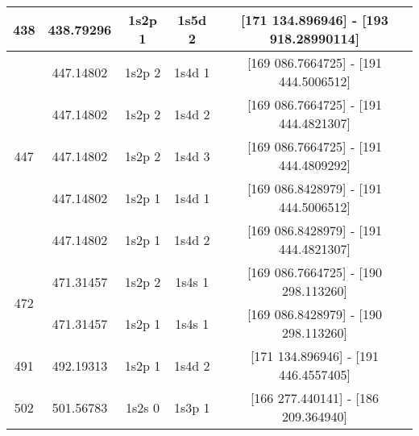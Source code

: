{\begin{table}[B]
\begin{adjustwidth}{-1in}{-1in}
\begin{tabular}{ccccc}
\midrule
	 438& 438.79296 & 1s2p  1&  1s5d  2& [171 134.896946]  	- 	[193 918.28990114]\\
\midrule
	 \multirow{5}{*}{447}& 447.14802& 1s2p  2& 1s4d  1& [169 086.7664725] 	- 	[191 444.5006512]\\
	 & 447.14802 & 1s2p  2& 1s4d  2& [169 086.7664725] 	- 	[191 444.4821307]\\
	 & 447.14802 & 1s2p  2& 1s4d  3& [169 086.7664725] 	- 	[191 444.4809292]\\
	 & 447.14802 & 1s2p  1& 1s4d  1& [169 086.8428979] 	- 	[191 444.5006512] \\
	 & 447.14802 & 1s2p  1& 1s4d  2& [169 086.8428979] 	- 	[191 444.4821307]\\
\midrule
	 \multirow{2}{*}{472}& 471.31457& 1s2p  2& 1s4s 1& [169 086.7664725] 	- 	[190 298.113260] \\
	 & 471.31457&  1s2p  1&  1s4s  1& [169 086.8428979] 	- 	[190 298.113260] \\
\midrule
	 491 & 492.19313 & 1s2p  1&  1s4d  2& [171 134.896946]  	- 	[191 446.4557405]\\
	502 & 501.56783& 1s2s  0& 1s3p  1& [166 277.440141]  	- 	[186 209.364940] \\
\bottomrule
\end{tabular}
\end{adjustwidth}
\end{table}
}
